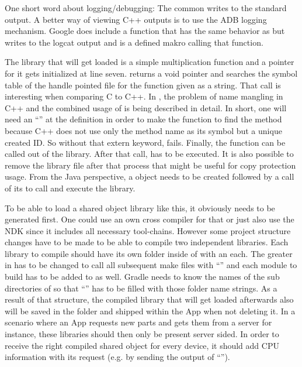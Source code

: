 One short word about logging/debugging: The common  writes to the standard output. A better way of viewing C++ outputs is to use the ADB logging mechanism. Google does include a  function that
has the same behavior as  but writes to the logcat output and 
 is a defined makro calling that function. 

The library that will get loaded is a simple multiplication function and a pointer
for it gets initialized at line seven.  returns a void pointer and
 searches the symbol table of the handle pointed file for the function
given as a string. That call is interesting when comparing C to C++. In 
\parencite{dlopen_howto}, the problem of name mangling in C++ and the combined usage of
 is being described in detail.
In short, one will need an ``'' at the  definition in order to make the  function to find the method
because C++ does not use only the method name as its symbol but a unique created ID.
So without that extern keyword,  fails.
Finally, the  function can be called out of the library.
After that call,  has to be executed. It is also possible to remove
the library file after that process that might be useful for copy protection usage.
From the Java perspective, a  object needs to be created followed by 
a call of its  to call and execute the library.

To be able to load a shared object library like this, it obviously needs to be
generated first. One could use an own cross compiler for that or just also use 
the NDK since it includes all necessary tool-chains. 
However some project structure changes have to be made to be able to compile two independent libraries. Each library to compile should have its own folder inside
of  with an  each. The greater  in
 has to be changed to call all subsequent make files with 
``'' and each module to build has to be
added to  as well. Gradle needs to know the names of the sub 
directories of  so that ``'' has to be
filled with those folder name strings. As a result of that structure, the compiled
library that will get loaded afterwards also will be saved in the  folder
and shipped within the App when not deleting it. In a scenario where an App requests new
parts and gets them from a server for instance, these libraries should then only be
present server sided. In order to receive the right compiled shared object for every
device, it should add CPU information with its request (e.g. by sending the output
of ``'').


